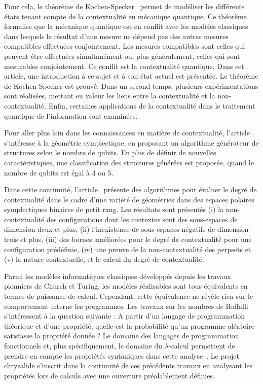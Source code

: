 \documentclass[10pt, a4paper, french]{article}
\begin{document}
Pour cela, le théorème de Kochen-Specker~\cite{RevModPhys.94.045007} permet de modéliser les différents états tenant compte de la contextualité en mécanique quantique.
 Ce théorème formalise que la mécanique quantique est en conflit avec les modèles classiques dans lesquels le résultat d'une mesure ne dépend pas des autres mesures compatibles effectuées conjointement.
Les mesures compatibles sont celles qui peuvent être effectuées simultanément ou, plus généralement, celles qui sont mesurables conjointement. Ce conflit est la contextualité quantique.
Dans cet article, une introduction à ce sujet et à son état actuel est présentée. Le théorème de Kochen-Specker est prouvé. Dans un second temps, plusieurs expérimentations sont réalisées, mettant en valeur les liens entre la contextualité et la non-contextualité. Enfin, certaines applications de la contextualité dans le traitement quantique de l'information sont examinées. 

Pour aller plus loin dans les connaissances en matière de contextualité, l'article~\cite{MULLER2022101853} s'intéresse à la géométrie symplectique, en proposant un algorithme générateur de structures selon le nombre de qubits. En plus de définir de nouvelles caractéristiques, une classification des structures générées est proposée, quand le nombre de qubits est égal à 4 ou 5.


Dans cette continuité, l'article~\cite{contextAG}
présente des algorithmes pour évaluer le degré de contextualité dans le cadre d'une variété de géométries dans des espaces polaires symplectiques binaires de petit rang. Les résultats sont présentés (i) la non-contextualité des configurations dont les contextes sont des sous-espaces de dimension deux et plus, (ii) l'inexistence de sous-espaces négatifs de dimension trois et plus, (iii) des bornes améliorées pour le degré de contextualité pour une configuration prédéfinie, (iv) une preuve de la non-contextualité des perpsets et (v) la nature contextuelle, et le calcul du degré de contextualité.

Parmi les modèles informatiques classiques développés depuis les travaux pionniers de Church et Turing, les modèles réalisables sont tous équivalents en termes de puissance de calcul.
Cependant, cette équivalence ne révèle rien sur le comportement interne les programmes. Les travaux sur les nombres de Raffalli s'intéressent à la question suivante :
A partir d'un langage de programmation théorique et d'une propriété, quelle est la probabilité qu'un programme aléatoire satisfasse la propriété donnée ? Le domaine des langages de programmation fonctionnels et, plus spécifiquement, le domaine du $\lambda$-calcul permettent de prendre en compte les propriétés syntaxiques dans cette analyse~\cite{david2009some}. Le projet chrysalide s'inscrit dans la continuité de ces précédents travaux en analysant les propriétés lors de calculs avec une ouverture préalablement définies.
\end{document}
